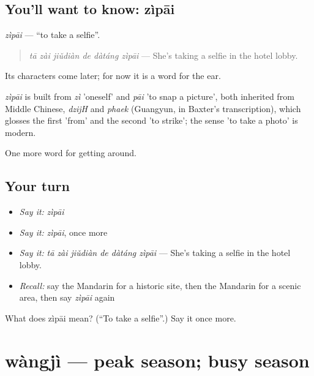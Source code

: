 \subsection*{You'll want to know: zìpāi}
\emph{zìpāi} — \textquotedblleft{}to take a selfie\textquotedblright{}.

\begin{quote}
\emph{tā zài jiǔdiàn de dàtáng zìpāi} — She's taking a selfie in the hotel lobby.
\end{quote}

Its characters come later; for now it is a word for the ear.

\begin{cousinweb}
\emph{zìpāi} is built from \emph{zì} 'oneself' and \emph{pāi} 'to snap a picture', both inherited from Middle Chinese, \emph{dzijH} and \emph{phaek} (Guangyun, in Baxter's transcription), which glosses the first 'from' and the second 'to strike'; the sense 'to take a photo' is modern.
\end{cousinweb}

\begin{grammarlens}[title={What you've built}]
One more word for getting around.
\end{grammarlens}

\subsection*{Your turn}
\begin{itemize}
\raggedright
  \item \emph{Say it:} \emph{zìpāi}
  \item \emph{Say it:} \emph{zìpāi}, once more
  \item \emph{Say it:} \emph{tā zài jiǔdiàn de dàtáng zìpāi} — She's taking a selfie in the hotel lobby.
  \item \emph{Recall:} say the Mandarin for a historic site, then the Mandarin for a scenic area, then say \emph{zìpāi} again
\end{itemize}

\begin{tcolorbox}[breakable,colback=teal!4,colframe=teal!35!black,title={Before you move on}]
What does zìpāi mean? (\textquotedblleft{}To take a selfie\textquotedblright{}.) Say it once more.
\end{tcolorbox}
\section[wàngjì]{wàngjì — peak season; busy season}

